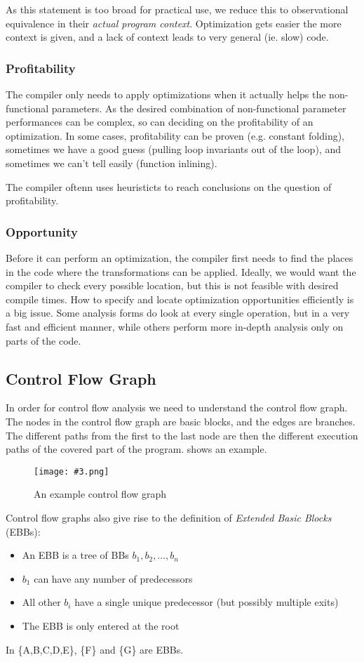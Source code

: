 \documentclass{article}
\newcommand{\fig}[4]{
	\begin{figure}[#1]
		\center
		\texttt{[image: \#3.png]}
		\caption{#4}
		\label{fig:#3}
	\end{figure}
	}
\begin{document}
As this statement is too broad for practical use, we reduce this to observational equivalence in their \emph{actual program context}.
Optimization gets easier the more context is given, and a lack of context leads to very general (ie. slow) code.

\subsubsection{Profitability}
The compiler only needs to apply optimizations when it actually helps the non-functional parameters.
As the desired combination of non-functional parameter performances can be complex, so can deciding on the profitability of an optimization.
In some cases, profitability can be proven (e.g. constant folding), sometimes we have a good guess (pulling loop invariants out of the loop), and sometimes we can't tell easily (function inlining).

The compiler oftenn uses heuristicts to reach conclusions on the question of profitability.

\subsubsection{Opportunity}
Before it can perform an optimization, the compiler first needs to find the places in the code where the transformations can be applied.
Ideally, we would want the compiler to check every possible location, but this is not feasible with desired compile times.
How to specify and locate optimization opportunities efficiently is a big issue.
Some analysis forms do look at every single operation, but in a very fast and efficient manner, while others perform more in-depth analysis only on parts of the code.

\subsection{Control Flow Graph}
\label{cfg}
In order for control flow analysis we need to understand the control flow graph.
The nodes in the control flow graph are basic blocks, and the edges are branches.
The different paths from the first to the last node are then the different execution paths of the covered part of the program.
 shows an example.

\fig{h}{0.7}{cfg}{An example control flow graph}

Control flow graphs also give rise to the definition of \emph{Extended Basic Blocks} (EBBs):
\begin{itemize}
	\item An EBB is a tree of BBs $b_1,b_2,\dots,b_n$
	\item $b_1$ can have any number of predecessors
	\item All other $b_i$ have a single unique predecessor (but possibly multiple exits)
	\item The EBB is only entered at the root
\end{itemize}
In  \{A,B,C,D,E\}, \{F\} and \{G\} are EBBs.
\end{document}
